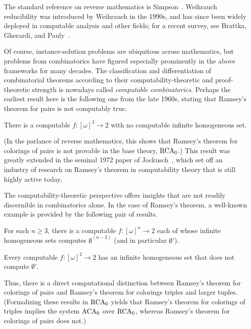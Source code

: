 The standard reference on reverse mathematics is Simpson~\cite{Simpson2009Subsystems}. Weihrauch reducibility was introduced by Weihrauch \cite{Weihrauch1992} in the 1990s, and has since been widely deployed in computable analysis and other fields; for a recent survey, see Brattka, Gherardi, and Pauly~\cite{BrattkaSurvey}.

Of course, instance-solution problems are ubiquitous across mathematics, but problems from combinatorics have figured especially prominently in the above frameworks for many decades. The classification and differentiation of combinatorial theorems according to their computability-theoretic and proof-theoretic strength is nowadays called \emph{computable combinatorics}. Perhaps the earliest result here is the following one from the late 1960s, stating that Ramsey's theorem for pairs is not computably true.

\begin{theorem}
	There is a computable $f: [\omega]^2 \to 2$ with no computable infinite homogeneous set.
\end{theorem}
 
\noindent (In the parlance of reverse mathematics, this shows that Ramsey's theorem for colorings of pairs is not provable in the base theory, $\mathrm{RCA}_0$.) This result was greatly extended in the seminal 1972 paper of Jockusch~\cite{Jockusch1972Ramseys}, which set off an industry of research on Ramsey's theorem in computability theory that is still highly active today.
 
The computability-theoretic perspective offers insights that are not readily discernible in combinatorics alone. In the case of Ramsey's theorem, a well-known example is provided by the following pair of results.

\begin{theorem}
	For each $n \geq 3$, there is a computable $f: [\omega]^n \to 2$ each of whose infinite homogeneous sets computes $\emptyset^{(n-2)}$ (and in particular $\emptyset'$).
\end{theorem}
 
\begin{theorem}\label{thm:Seetapun}
	Every computable $f: [\omega]^2 \to 2$ has an infinite homogeneous set that does not compute $\emptyset'$.	
\end{theorem}
 
\noindent Thus, there is a direct computational distinction between Ramsey's theorem for colorings of pairs and Ramsey's theorem for colorings triples and larger tuples. (Formalizing these results in $\mathrm{RCA}_0$ yields that Ramsey's theorem for colorings of triples implies the system $\mathrm{ACA}_0$ over $\mathrm{RCA}_0$, whereas Ramsey's theorem for colorings of pairs does not.)

